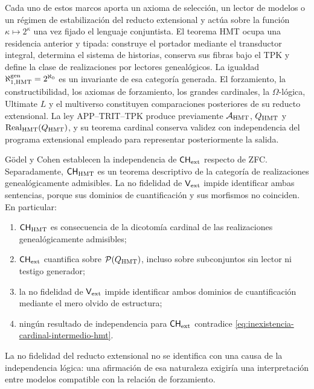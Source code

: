 Cada uno de estos marcos aporta un axioma de selección, un lector de modelos o
un régimen de estabilización del reducto extensional y actúa sobre la función
\(\kappa\mapsto2^\kappa\) una vez fijado el lenguaje conjuntista. El teorema
HMT ocupa una residencia anterior y tipada: construye el portador mediante
el transductor integral, determina el sistema de historias, conserva sus
fibras bajo el TPK y define la clase de realizaciones por lectores
genealógicos. La igualdad
\(\aleph_{1,\rm HMT}^{\rm gen}=2^{\aleph_0}\) es un invariante de esa
categoría generada. El forzamiento, la constructibilidad, los axiomas de
forzamiento, los grandes cardinales, la \(\Omega\)-lógica, Ultimate \(L\) y
el multiverso constituyen comparaciones posteriores de su reducto extensional.
La ley APP--TRIT--TPK produce previamente \(\mathcal A_{\rm HMT}\),
\(Q_{\rm HMT}\) y \(\operatorname{Real}_{\rm HMT}(Q_{\rm HMT})\), y su
teorema cardinal conserva validez con independencia del programa extensional
empleado para representar posteriormente la salida.

\begin{theorem}
\label{thm:alcance-godel-cohen-reducto}
G\"odel y Cohen establecen la independencia de
\(\mathsf{CH}_{\rm ext}\) respecto de ZFC. Separadamente,
\(\mathsf{CH}_{\rm HMT}\) es un teorema descriptivo de la categor\'ia de
realizaciones geneal\'ogicamente admisibles. La no fidelidad de
\(\mathsf V_{\rm ext}\) impide identificar ambas sentencias, porque sus
dominios de cuantificaci\'on y sus morfismos no coinciden. En particular:
\begin{enumerate}[label=\textup{(\roman*)}]
 \item \(\mathsf{CH}_{\rm HMT}\) es consecuencia de la dicotom\'ia cardinal
 de las realizaciones geneal\'ogicamente admisibles;
 \item \(\mathsf{CH}_{\rm ext}\) cuantifica sobre
 \(\mathcal P(Q_{\rm HMT})\), incluso sobre subconjuntos sin lector ni
 testigo generador;
 \item la no fidelidad de \(\mathsf V_{\rm ext}\) impide identificar ambos
 dominios de cuantificaci\'on mediante el mero olvido de estructura;
 \item ning\'un resultado de independencia para
 \(\mathsf{CH}_{\rm ext}\) contradice
 \eqref{eq:inexistencia-cardinal-intermedio-hmt}.
\end{enumerate}
La no fidelidad del reducto extensional no se identifica con una causa de
la independencia l\'ogica: una afirmaci\'on de esa naturaleza exigir\'ia una
interpretaci\'on entre modelos compatible con la relaci\'on de forzamiento.
\end{theorem}

